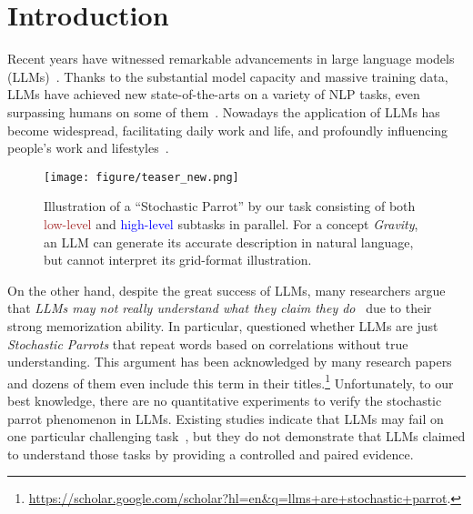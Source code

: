 \section{Introduction}









Recent years have witnessed remarkable advancements in large language models (LLMs)~\cite{brown2020language,achiam2023gpt,team2023gemini}. 
Thanks to the substantial model capacity and massive training data, LLMs have achieved new state-of-the-arts on a variety of NLP tasks, even surpassing humans on some of them~\cite{min2023recent,chang2024survey}.
Nowadays the application of LLMs has become widespread, facilitating daily work and life, and profoundly influencing people's work and lifestyles~\cite{bommasani2021opportunities,peng2024large,demszky2023using}.

\begin{figure}[t!]
\centering
\texttt{[image: figure/teaser\_new.png]}
\vspace{-0.1in}
\caption{Illustration of a ``Stochastic Parrot'' by our \datasetname task consisting of both \textcolor{brown}{low-level} and \textcolor{blue}{high-level} subtasks in parallel. For a concept {\em Gravity}, an LLM can generate its accurate description in natural language, but cannot interpret its grid-format illustration.}
\label{fig:teaser}
\vspace{-2ex}
\end{figure}

On the other hand, despite the great success of LLMs, many researchers argue that {\em LLMs may not really understand what they claim they do}~\cite{bender2020climbing,bender2021dangers,bommasani2021opportunities,mitchell2023debate} due to their strong memorization ability.
In particular, \citet{bender2021dangers} questioned whether LLMs are just \textit{Stochastic Parrots} that repeat words based on correlations without true understanding. 
This argument has been acknowledged by many research papers and dozens of them even include this term in their titles.\footnote{\url{https://scholar.google.com/scholar?hl=en\&q=llms+are+stochastic+parrot}.} Unfortunately, to our best knowledge, there are no quantitative experiments to verify the stochastic parrot phenomenon in LLMs. Existing studies indicate that LLMs may fail on one particular challenging task~\cite{chakrabarty-etal-2022-flute,shapira-etal-2023-well,hessel-etal-2023-androids,tong2024metaphor}, but they do not demonstrate that LLMs claimed to understand those tasks by providing a controlled and paired evidence. 

